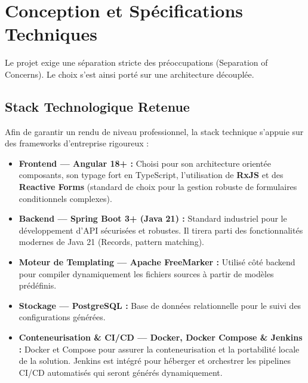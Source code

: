 \documentclass[12pt,a4paper]{article}
\begin{document}
\section{Conception et Spécifications Techniques}

Le projet exige une séparation stricte des préoccupations (Separation of Concerns). Le choix s'est ainsi porté sur une architecture découplée.

\subsection{Stack Technologique Retenue}
Afin de garantir un rendu de niveau professionnel, la stack technique s'appuie sur des frameworks d'entreprise rigoureux :
\begin{itemize}[label=\textcolor{primary}{\textbullet}]
    \item \textbf{Frontend --- Angular 18+ :} Choisi pour son architecture orientée composants, son typage fort en TypeScript, l'utilisation de \textbf{RxJS} et des \textbf{Reactive Forms} (standard de choix pour la gestion robuste de formulaires conditionnels complexes).
    \item \textbf{Backend --- Spring Boot 3+ (Java 21) :} Standard industriel pour le développement d'API sécurisées et robustes. Il tirera parti des fonctionnalités modernes de Java 21 (Records, pattern matching).
    \item \textbf{Moteur de Templating --- Apache FreeMarker :} Utilisé côté backend pour compiler dynamiquement les fichiers sources à partir de modèles prédéfinis.
    \item \textbf{Stockage --- PostgreSQL :} Base de données relationnelle pour le suivi des configurations générées.
    \item \textbf{Conteneurisation \& CI/CD --- Docker, Docker Compose \& Jenkins :} Docker et Compose pour assurer la conteneurisation et la portabilité locale de la solution. Jenkins est intégré pour héberger et orchestrer les pipelines CI/CD automatisés qui seront générés dynamiquement.
\end{itemize}
\end{document}
